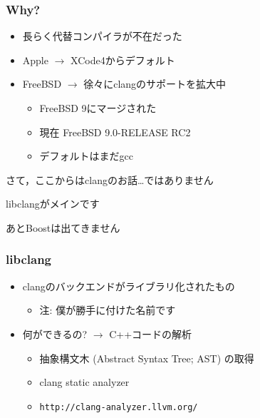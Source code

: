 \documentclass[12pt,xgraphicx=dvips,xcolor=dvips]{beamer}
\begin{document}
\begin{frame}
  \frametitle{Why?}

  \begin{itemize}
    \setlength{\itemsep}{1.5zh}
    \item 長らく代替コンパイラが不在だった
    \item Apple $\rightarrow$ XCode4からデフォルト
    \item FreeBSD $\rightarrow$ 徐々にclangのサポートを拡大中
      \begin{itemize}
        \item FreeBSD 9にマージされた
        \item 現在 FreeBSD 9.0-RELEASE RC2
        \item デフォルトはまだgcc
      \end{itemize}
  \end{itemize}
\end{frame}

\begin{frame}
  \begin{center}
    さて，ここからはclangのお話…ではありません
  \end{center}

  \pause

  \begin{center}
    libclangがメインです
  \end{center}

  \pause

  \begin{center}
    あとBoostは出てきません
  \end{center}
\end{frame}

\begin{frame}
  \frametitle{libclang}

  \begin{itemize}
    \setlength{\itemsep}{1.5zh}
    \item clangのバックエンドがライブラリ化されたもの
      \begin{itemize}
        \item 注: 僕が勝手に付けた名前です
      \end{itemize}
    \item 何ができるの? $\rightarrow$ C++コードの解析
      \begin{itemize}
        \item 抽象構文木 (Abstract Syntax Tree; AST) の取得
        \item clang static analyzer
        \item {\tt http://clang-analyzer.llvm.org/}
      \end{itemize}
  \end{itemize}
\end{frame}
\end{document}
